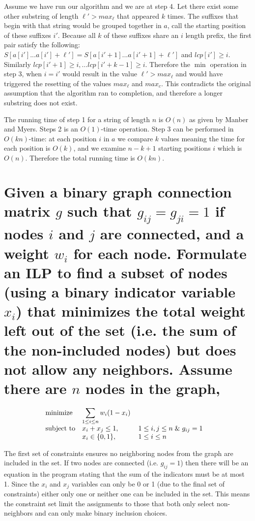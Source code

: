 \documentclass[11pt, oneside]{article}   	%
\begin{document}
Assume we have run our algorithm and we are at step 4. 
Let there exist some other substring of length $\ell'>max_\ell$ that appeared $k$ times.
The suffixes that begin with that string would be grouped together in $a$, call the starting position of these suffixes $i'$. 
Because all $k$ of these suffixes share an $i$ length prefix, the first pair satisfy the following: $S[a[i']...a[i']+\ell'] = S[a[i'+1]...a[i'+1]+\ell']$ and $lcp[i']\ge i$. 
Similarly $lcp[i'+1]\ge i, ... lcp[i'+k-1]\ge i$. 
Therefore the $\min$ operation in step 3, when $i=i'$ would result in the value $\ell' > max_\ell$ and would have triggered the resetting of the values $max_\ell$ and $max_c$. 
This contradicts the original assumption that the algorithm ran to completion, and therefore a longer substring does not exist. 

The running time of step 1 for a string of length $n$ is $O(n)$ as given by Manber and Myers. 
Steps 2 is an $O(1)$-time operation. 
Step 3 can be performed in $O(kn)$-time: at each position $i$ in $a$ we compare $k$ values meaning the time for each position is $O(k)$, and we examine $n-k+1$ starting positions $i$ which is $O(n)$.
Therefore the total running time is $O(kn)$.


\section{Given a binary graph connection matrix $g$ such that $g_{ij} = g_{ji} = 1$ if nodes $i$ and $j$ are connected, and a weight $w_{i}$ for each node. 
Formulate an ILP to find a subset of nodes (using a binary indicator variable $x_i$) that minimizes the total weight left out of the set (i.e. the sum of the non-included nodes) but does not allow any neighbors. 
Assume there are $n$ nodes in the graph,}

\begin{equation*}
\begin{array}{ll@{}ll}
\text{minimize}  & \displaystyle \sum_{1\leq i \leq n} w_i (1 - x_i)  &&\\
\text{subject to}& x_i + x_j \le 1,  & 1 \le i,j \le n \;\&\; g_{ij} = 1\\
			& x_{i} \in \{0,1\}, \;\;\;\; \;\;\;\; \;\;\;\;&1 \le i \le n
\end{array}
\end{equation*}

The first set of constraints ensures no neighboring nodes from the graph are included in the set. 
If two nodes are connected (i.e. $g_{ij} = 1$) then there will be an equation in the program stating that the sum of the indicators must be at most 1. 
Since the $x_i$ and $x_j$ variables can only be 0 or 1 (due to the final set of constraints) either only one or neither one can be included in the set. 
This means the constraint set limit the assignments to those that both only select non-neighbors and can only make binary inclusion choices. 
\end{document}
